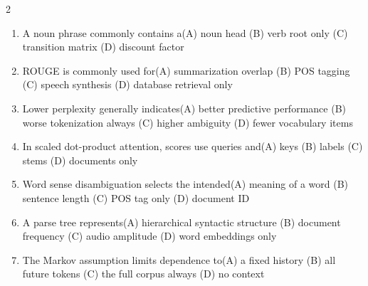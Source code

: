 \documentclass[a4paper]{article}
\begin{document}
\begin{multicols*}{2}
\begin{enumerate}[resume]
\item A noun phrase commonly contains a\newline\hspace*{0.6em}(A) noun head \quad (B) verb root only \newline\hspace*{0.6em}(C) transition matrix \quad (D) discount factor
\item ROUGE is commonly used for\newline\hspace*{0.6em}(A) summarization overlap \quad (B) POS tagging \newline\hspace*{0.6em}(C) speech synthesis \quad (D) database retrieval only
\item Lower perplexity generally indicates\newline\hspace*{0.6em}(A) better predictive performance \quad (B) worse tokenization always \newline\hspace*{0.6em}(C) higher ambiguity \quad (D) fewer vocabulary items
\item In scaled dot-product attention, scores use queries and\newline\hspace*{0.6em}(A) keys \quad (B) labels \newline\hspace*{0.6em}(C) stems \quad (D) documents only
\item Word sense disambiguation selects the intended\newline\hspace*{0.6em}(A) meaning of a word \quad (B) sentence length \newline\hspace*{0.6em}(C) POS tag only \quad (D) document ID
\item A parse tree represents\newline\hspace*{0.6em}(A) hierarchical syntactic structure \quad (B) document frequency \newline\hspace*{0.6em}(C) audio amplitude \quad (D) word embeddings only
\item The Markov assumption limits dependence to\newline\hspace*{0.6em}(A) a fixed history \quad (B) all future tokens \newline\hspace*{0.6em}(C) the full corpus always \quad (D) no context

\end{enumerate}
\end{multicols*}
\end{document}
